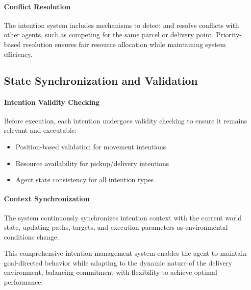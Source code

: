 \paragraph{Conflict Resolution}
The intention system includes mechanisms to detect and resolve conflicts with other agents, such as competing for the same parcel or delivery point. Priority-based resolution ensures fair resource allocation while maintaining system efficiency.

\subsection{State Synchronization and Validation}

\paragraph{Intention Validity Checking}
Before execution, each intention undergoes validity checking to ensure it remains relevant and executable:
\begin{itemize}
    \item Position-based validation for movement intentions
    \item Resource availability for pickup/delivery intentions
    \item Agent state consistency for all intention types
\end{itemize}

\paragraph{Context Synchronization}
The system continuously synchronizes intention context with the current world state, updating paths, targets, and execution parameters as environmental conditions change.

This comprehensive intention management system enables the agent to maintain goal-directed behavior while adapting to the dynamic nature of the delivery environment, balancing commitment with flexibility to achieve optimal performance.
